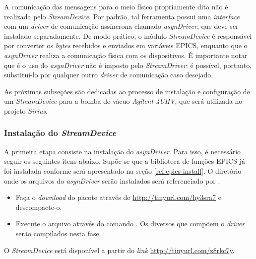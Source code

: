 \vspace{12pt}

A comunicação das mensagens para o meio físico propriamente dita não é realizada
pelo \textit{StreamDevice}. Por padrão, tal ferramenta possui uma
\textit{interface} com um \textit{driver} de comunicação assíncrona chamado
\textit{asynDriver}, que deve ser instalado separadamente. De modo prático, o
módulo \textit{StreamDevice} é responsável por converter os \textit{bytes}
recebidos e enviados em variáveis EPICS, enquanto que o \textit{asynDriver}
realiza a comunicação física com os dispositivos. É importante notar que é
o uso do \textit{asynDriver} não é imposto pelo \textit{StreamDriver}: é
possível, portanto, substituí-lo por qualquer outro \textit{driver} de
comunicação caso desejado.

\vspace{12pt}

As próximas subseções são dedicadas ao processo de instalação e configuração de
um \textit{StreamDevice} para a bomba de vácuo \textit{Agilent 4UHV}, que será
utilizada no projeto \textit{Sirius}.

\subsubsection{Instalação do \textit{StreamDevice}}

A primeira etapa consiste na instalação do \textit{asynDriver}. Para isso, é
necessário seguir os seguintes itens abaixo. Supõe-se que a biblioteca de
funções EPICS já foi instalada conforme será apresentado na seção
\ref{ref:epics-install}. O diretório onde os arquivos do \textit{asynDriver}
serão instalados será referenciado por .

\begin{itemize}
  \renewcommand\labelitemi{--}
  \item Faça o \textit{download} do pacote através de 
  \url{http://tinyurl.com/hy3sra7} e descompacte-o.
  \item Execute o arquivo  através do comando . Os
  diversos que compõem o \textit{driver} serão compilados nesta fase.
\end{itemize}

O \textit{StreamDevice} está disponível a partir do \textit{link}
\url{http://tinyurl.com/z8rkc7y}.
